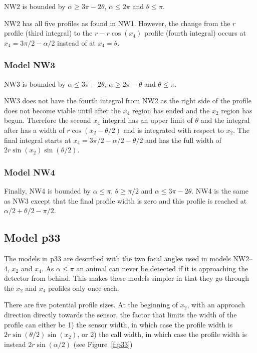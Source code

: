NW2 is bounded by $\alpha \ge 3\pi - 2\theta$, $\alpha \le 2\pi$ and $\theta\le\pi$.

NW2 has all five profiles as found in NW1. However, the change from the $r$ profile (third integral) to the $r - r\cos(x_4)$ profile (fourth integral) occurs at $x_4 = 3\pi/2 - \alpha/2$ instead of at $x_4 = \theta$. 




\subsubsection{Model NW3} \label{NW3}

NW3 is bounded by $\alpha \le 3\pi - 2\theta$, $\alpha\ge 2\pi-\theta$ and $\theta\le\pi$.

NW3 does not have the fourth integral from NW2 as the right side of the profile does not become viable until after the $x_4$ region has ended and the $x_2$ region has begun. Therefore the second $x_4$ integral has an upper limit of $\theta $ and the integral after has a width of $r\cos(x_2 - \theta/2)$ and is integrated with respect to $x_2$. The final integral starts at $x_4 = 3\pi/2 - \alpha/2 - \theta/2$ and has the full width of $2r\sin(x_2)\sin(\theta/2)$.



\subsubsection{Model NW4} \label{NW4}

Finally, NW4 is bounded by $\alpha\le \pi$, $\theta\ge \pi/2$ and $\alpha \le 3\pi - 2\theta$. NW4 is the same as NW3 except that the final profile width is zero and this profile is reached at $\alpha/2+\theta/2-\pi/2$. 



\subsection{Model p33} \label{p33}
 
The models in p33 are described with the two focal angles used in models NW2--4, $x_2$ and $x_4$. As $\alpha \le\pi$ an animal can never be detected if it is approaching the detector from behind. This makes these models simpler in that they go through the $x_2$ and $x_4$ profiles only once each. 

There are five potential profile sizes. At the beginning of $x_2$, with an approach direction directly towards the sensor, the factor that limits the width of the profile can either be 1) the sensor width,  in which case the profile width is $2r\sin\left(\theta/2\right)\sin(x_2)$, or 2) the call width, in which case the profile width is instead $2r\sin(\alpha /2)$ (see Figure~\ref{f:p33})


